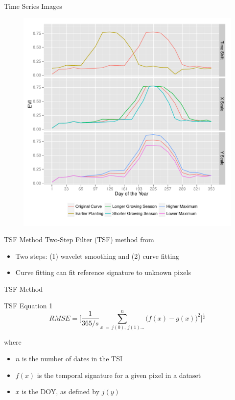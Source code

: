 \documentclass[draft,compress]{beamer}
\begin{document}
\begin{frame}{Time Series Images}
\begin{figure}
  \centering
  \includegraphics[width=0.7\linewidth]{Graphics/transformations.pdf}
\end{figure}
\end{frame}

\begin{frame}{TSF Method}
Two-Step Filter (TSF) method from \textcite{sakamoto2010a-two-step}
\begin{itemize}
  \item Two steps: (1) wavelet smoothing and (2) curve fitting
  \item Curve fitting can fit reference signature to unknown pixels
\end{itemize}
\end{frame}

\begin{frame}{TSF Method}
\begin{block}{TSF Equation 1}
  \begin{equation*}
    RMSE = \biggl[\frac{1}{365/s}\sum_{x\ =\ j(0),\ j(1)\ldots}^{n}\bigl(f\left(x\right)-g\left(x\right)\bigr)^{2}\biggr]^{\frac{1}{2}}
  \end{equation*}
\end{block}
\vspace{0.5\baselineskip}
where
\begin{itemize}
  \item $n$ is the number of dates in the TSI
  \item $f(x)$ is the temporal signature for a given pixel in a dataset
  \item $x$ is the DOY, as defined by $j(y)$
\end{itemize}
\end{frame}
\end{document}
